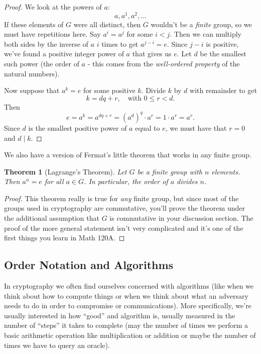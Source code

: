 \documentclass[12pt]{article}
\theoremstyle{plain}
\newtheorem{theorem}{Theorem}[section]
\theoremstyle{definition}
\theoremstyle{remark}
\begin{document}
\begin{proof}
    We look at the powers of $a$:
    \[
        a, a^1, a^2, \ldots
    \]
    If these elements of $G$ were all distinct, then $G$ wouldn't be a \emph{finite} group, so we must have repetitions here.
    Say $a^i = a^j$ for some $i<j$.
    Then we can multiply both sides by the inverse of $a$ $i$ times to get $a^{j-i} = e$.
    Since $j-i$ is positive, we've found a positive integer power of $a$ that gives us $e$.
    Let $d$ be the smallest such power (the order of $a$ - this comes from the \emph{well-ordered property} of the natural numbers).


    Now suppose that $a^k = e$ for some positive $k$.
    Divide $k$ by $d$ with remainder to get
    \[
        k = dq + r,\quad \text{with }0\leq r < d.
    \]
    Then 
    \[
        e = a^k = a^{dq + r} = (a^d)^q\cdot a^r = 1\cdot a^r = a^r.
    \]
    Since $d$ is the smallest positive power of $a$ equal to $e$, we must have that $r = 0$ and $d\mid k$.
\end{proof}


We also have a version of Fermat's little theorem that works in any finite group.

\begin{theorem}[Lagrange's Theorem]
    Let $G$ be a finite group with $n$ elements.
    Then $a^n  = e$ for all $a\in G$.
    In particular, the order of $a$ divides $n$.
\end{theorem}
\begin{proof}
    This theorem really is true for \emph{any} finite group, but since most of the groups used in cryptography are commutative, you'll prove the theorem under the additional assumption that $G$ is commutative in your discussion section.
    The proof of the more general statement isn't very complicated and it's one of the first things you learn in Math 120A.
\end{proof}










\subsection{Order Notation and Algorithms}
In cryptography we often find ourselves concerned with algorithms (like when we think about how to compute things or when we think about what an adversary needs to do in order to compromise or communications).
More specifically, we're usually interested in how ``good'' and algorithm is, usually measured in the number of ``steps'' it takes to complete (may the number of times we perform a basic arithmetic operation like multiplication or addition or maybe the number of times we have to query an oracle).
\end{document}
